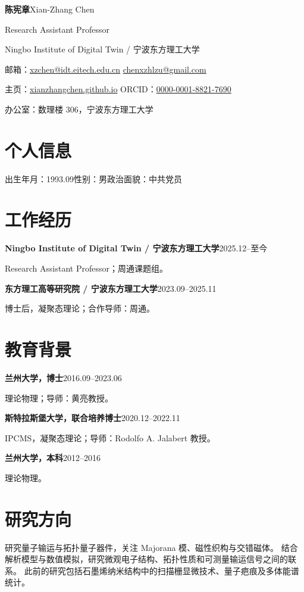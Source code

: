 \documentclass[11pt,a4paper]{article}
\begin{document}
{\LARGE\bfseries 陈宪章}\hfill Xian-Zhang Chen\par
Research Assistant Professor\par
Ningbo Institute of Digital Twin / 宁波东方理工大学\par
邮箱：\href{mailto:xzchen@idt.eitech.edu.cn}{xzchen@idt.eitech.edu.cn}\quad
\href{mailto:chenxzhlzu@gmail.com}{chenxzhlzu@gmail.com}\par
主页：\href{https://xianzhangchen.github.io/}{xianzhangchen.github.io}\quad
ORCID：\href{https://orcid.org/0000-0001-8821-7690}{0000-0001-8821-7690}\par
办公室：数理楼 306，宁波东方理工大学\par

\section{个人信息}
出生年月：1993.09\qquad 性别：男\qquad 政治面貌：中共党员

\section{工作经历}
\textbf{Ningbo Institute of Digital Twin / 宁波东方理工大学}\hfill 2025.12--至今\par
Research Assistant Professor；周通课题组。

\textbf{东方理工高等研究院 / 宁波东方理工大学}\hfill 2023.09--2025.11\par
博士后，凝聚态理论；合作导师：周通。

\section{教育背景}
\textbf{兰州大学，博士}\hfill 2016.09--2023.06\par
理论物理；导师：黄亮教授。

\textbf{斯特拉斯堡大学，联合培养博士}\hfill 2020.12--2022.11\par
IPCMS，凝聚态理论；导师：Rodolfo A. Jalabert 教授。

\textbf{兰州大学，本科}\hfill 2012--2016\par
理论物理。

\section{研究方向}
研究量子输运与拓扑量子器件，关注 Majorana 模、磁性织构与交错磁体。
结合解析模型与数值模拟，研究微观电子结构、拓扑性质和可测量输运信号之间的联系。
此前的研究包括石墨烯纳米结构中的扫描栅显微技术、量子疤痕及多体能谱统计。
\end{document}
